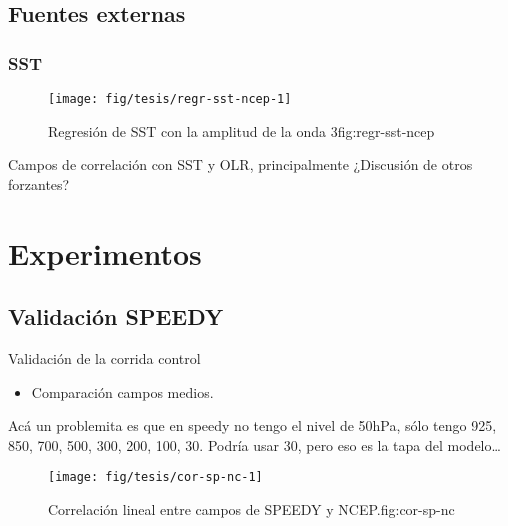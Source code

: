 \documentclass[spanish,a4paper]{book}
\providecommand{\tightlist}{%
  \setlength{\itemsep}{0pt}\setlength{\parskip}{0pt}}
\begin{document}
\section{Fuentes externas}\label{fuentes-externas}

\subsection{SST}\label{sst}

\begin{figure}

{\centering \texttt{[image: fig/tesis/regr-sst-ncep-1]} 

}

\caption{Regresión de SST con la amplitud de la onda 3{fig:regr-sst-ncep}}\label{fig:regr-sst-ncep}
\end{figure}

Campos de correlación con SST y OLR, principalmente ¿Discusión de otros
forzantes?

\chapter{Experimentos}\label{experimentos}

\section{Validación SPEEDY}\label{validacion-speedy}

Validación de la corrida control

\begin{itemize}
\tightlist
\item
  Comparación campos medios.
\end{itemize}

Acá un problemita es que en speedy no tengo el nivel de 50hPa, sólo
tengo 925, 850, 700, 500, 300, 200, 100, 30. Podría usar 30, pero eso es
la tapa del modelo\ldots{}

\begin{figure}
\texttt{[image: fig/tesis/cor-sp-nc-1]} \caption{Correlación lineal entre campos de SPEEDY y NCEP.{fig:cor-sp-nc}}\label{fig:cor-sp-nc}
\end{figure}
\end{document}
